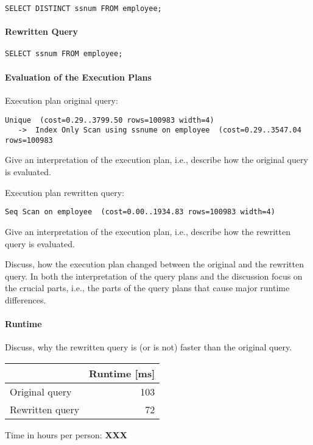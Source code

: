 \documentclass[11pt]{scrartcl}
\begin{document}
{\small
\begin{verbatim}
SELECT DISTINCT ssnum FROM employee;
\end{verbatim}
}

\paragraph{Rewritten Query}

{\small
\begin{verbatim}
SELECT ssnum FROM employee;
\end{verbatim}
}

\paragraph{Evaluation of the Execution Plans}

Execution plan original query:

\begin{verbatim}
Unique  (cost=0.29..3799.50 rows=100983 width=4)
   ->  Index Only Scan using ssnume on employee  (cost=0.29..3547.04 rows=100983
\end{verbatim}

Give an interpretation of the execution plan, i.e., describe how the
original query is evaluated.

Execution plan rewritten query:

\begin{verbatim}
Seq Scan on employee  (cost=0.00..1934.83 rows=100983 width=4)
\end{verbatim}

Give an interpretation of the execution plan, i.e., describe how the
rewritten query is evaluated.

Discuss, how the execution plan changed between the original and the
rewritten query. In both the interpretation of the query plans and the
discussion focus on the crucial parts, i.e., the parts of the query
plans that cause major runtime differences.

\paragraph{Runtime} Discuss, why the rewritten query is (or is not)
faster than the original query.


\begin{table}[H]
  \begin{tabular}{l|r}
    & Runtime [ms] \\
   \hline
    Original query & 103 \\
    Rewritten query & 72 \\
  \end{tabular}
\end{table}


  Time in hours per person: {\bf XXX}
\end{document}
